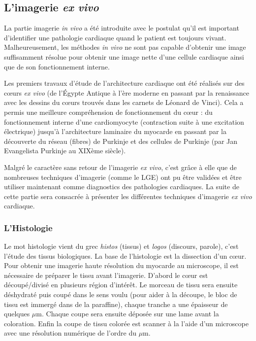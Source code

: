\subsection{L’imagerie \textit{ex vivo}}

La partie imagerie \textit{in vivo} a été introduite avec le postulat qu’il est important d’identifier une pathologie cardiaque quand le patient est toujours vivant. Malheureusement, les méthodes \textit{in vivo} ne sont pas capable d’obtenir une image suffisamment résolue pour obtenir une image nette d’une cellule cardiaque ainsi que de son fonctionnement interne.

Les premiers travaux d’étude de l’architecture cardiaque ont été réalisés sur des cœurs \textit{ex vivo} (de l’Égypte Antique à l’ère moderne en passant par la renaissance avec les dessins du cœurs trouvés dans les carnets de Léonard de Vinci). Cela a permis une meilleure compréhension de fonctionnement du cœur : du fonctionnement interne d’une cardiomyocyte (contraction suite à une excitation électrique) jusqu’à l’architecture laminaire du myocarde en passant par la découverte du réseau (fibres) de Purkinje et des cellules de Purkinje (par Jan Evangelista Purkinje au XIXème siècle).

 Malgré le caractère sans retour de l’imagerie \textit{ex vivo}, c’est grâce à elle que de nombreuses techniques d’imagerie (comme le LGE) ont pu être validées et être utiliser maintenant comme diagnostics des pathologies cardiaques. La suite de cette partie sera consacrée à présenter les différentes techniques d’imagerie \textit{ex vivo} cardiaque.

\subsubsection{L’Histologie}

Le mot histologie vient du grec \textit{histos} (tissus) et \textit{logos} (discours, parole), c’est l’étude des tissus biologiques. La base de l’histologie est la dissection d’un cœur. Pour obtenir une imagerie haute résolution du myocarde au microscope, il est nécessaire de préparer le tissu avant l’imagerie. D’abord le cœur est découpé/divisé en plusieurs région d’intérêt. Le morceau de tissu sera ensuite déshydraté puis coupé dans le sens voulu (pour aider à la découpe, le bloc de tissu est immergé dans de la paraffine), chaque tranche a une épaisseur de quelques $\mu$m. Chaque coupe sera ensuite déposée sur une lame avant la coloration. Enfin la coupe de tissu colorée est scanner à la l’aide d’un microscope avec une résolution numérique de l’ordre du $\mu$m.

